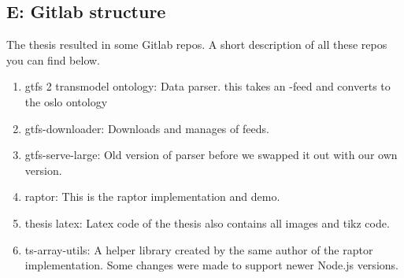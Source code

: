 \begin{appendices}
\section*{E: Gitlab structure}
The thesis resulted in some Gitlab repos. A short description of all these repos you can find below.
\begin{enumerate}
    \item gtfs 2 transmodel ontology: Data parser. this takes an -feed and converts to the oslo ontology
    \item gtfs-downloader: Downloads and manages of  feeds.
    \item gtfs-serve-large: Old version of parser before we swapped it out with our own version.
    \item raptor: This is the raptor implementation and demo.
    \item thesis latex: Latex code of the thesis also contains all images and tikz code.
    \item ts-array-utils: A helper library created by the same author of the raptor implementation. Some changes were made to support newer Node.js versions.
\end{enumerate}


\end{appendices}
